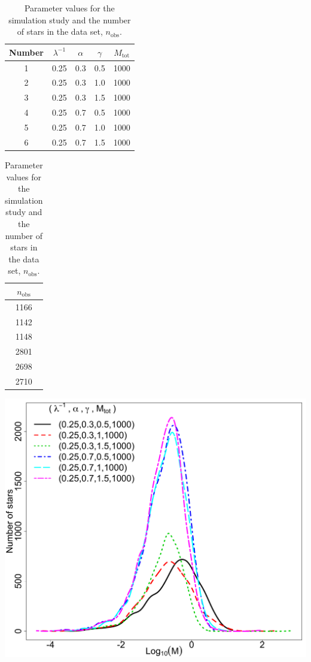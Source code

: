 \documentclass[12pt]{article}
\newcommand{\nobs}{n_{\text{obs}}}
\newcommand{\Mtot}{M_{\text{tot}}}
\begin{document}
\begin{table}[htbp]
\begin{minipage}[b]{0.48\linewidth}
\centering
   \begin{tabular}{|c|c|c|c|c|} %
   \hline
   Number & $\lambda^{-1}$ & $\alpha$ & $\gamma$  & $\Mtot$ \\
   \hline
1	&	0.25	&	0.3	&	0.5	& 1000 \\
2	&	0.25	&	0.3	&	1.0	& 1000 \\
3	&	0.25	&	0.3	&	1.5	& 1000 \\
4	&	0.25	&	0.7	&	0.5	& 1000 \\
5	&	0.25	&	0.7	&	1.0	& 1000 \\
6	&	0.25	&	0.7	&	1.5	& 1000 \\
\hline
   \end{tabular}
   \begin{tabular}{|c|} %
   \hline
 $\nobs$ \\
   \hline
1166	 \\
1142	 \\
1148	 \\
2801	 \\
2698	 \\
2710	 \\
\hline
   \end{tabular}
   \caption{Parameter values for the simulation study and the number of stars in the data set, $\nobs$.}
   \label{tab:sim_study}
\end{minipage}\hfill
\begin{minipage}[b]{0.48\linewidth}
\centering
\includegraphics[width = .8\textwidth]{figures/sim_study_true_imf.pdf} 
   \label{fig:true_imf}
\end{minipage}
\end{table}
\end{document}
